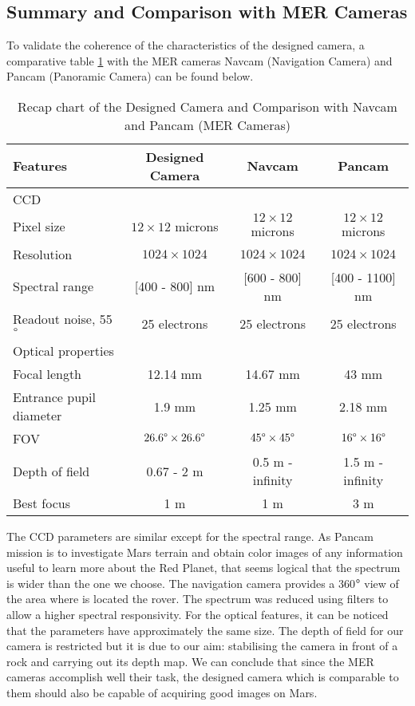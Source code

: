 \subsection{Summary and Comparison with MER Cameras}
To validate the coherence of the characteristics of the designed camera, a comparative table \ref{tabCameras} with the MER cameras Navcam (Navigation Camera) and Pancam (Panoramic Camera) \cite{merengineeringcameras} can be found below.

\begin{table}[H]
\centering
\caption{Recap chart of the Designed Camera and Comparison with Navcam and Pancam (MER Cameras)}
\label{tabCameras}
\renewcommand{\arraystretch}{1.5}
\begin{tabular}{|l|c c c|}
\hline
Features & Designed Camera & Navcam & Pancam \\
\hline
CCD &  &  &  \\
Pixel size & $12 \times 12 $ microns & $12 \times 12 $ microns & $12 \times 12 $ microns \\ 
Resolution & $1024 \times 1024 $ & $1024 \times 1024 $ & $1024 \times 1024 $ \\ 
Spectral range & [400 - 800] nm & [600 - 800] nm & [400 - 1100] nm \\ 
Readout noise, 55$\degree$ & 25 electrons & 25 electrons & 25 electrons \\
\hline
Optical properties & & &  \\
Focal length & 12.14 mm & 14.67 mm & 43 mm  \\
Entrance pupil diameter & 1.9 mm & 1.25 mm & 2.18 mm  \\
FOV & $26.6 \degree \times 26.6\degree$ & $45 \degree \times 45\degree$ & $16 \degree \times 16\degree$ \\
Depth of field & 0.67 - 2 m & 0.5 m - infinity & 1.5 m - infinity \\ 
Best focus & 1 m & 1 m & 3 m \\
\hline
\end{tabular}
\end{table}

The CCD parameters are similar except for the spectral range. As Pancam mission is to investigate Mars terrain and obtain color images of any information useful to learn more about the Red Planet, that seems logical that the spectrum is wider than the one we choose. The navigation camera provides a 360$\degree$ view of the area where is located the rover. The spectrum was reduced using filters to allow a higher spectral responsivity.
For the optical features, it can be noticed that the parameters have approximately the same size. The depth of field for our camera is restricted but it is due to our aim: stabilising the camera in front of a rock and carrying out its depth map.
We can conclude that since the MER cameras accomplish well their task, the designed camera which is comparable to them should also be capable of acquiring good images on Mars.

